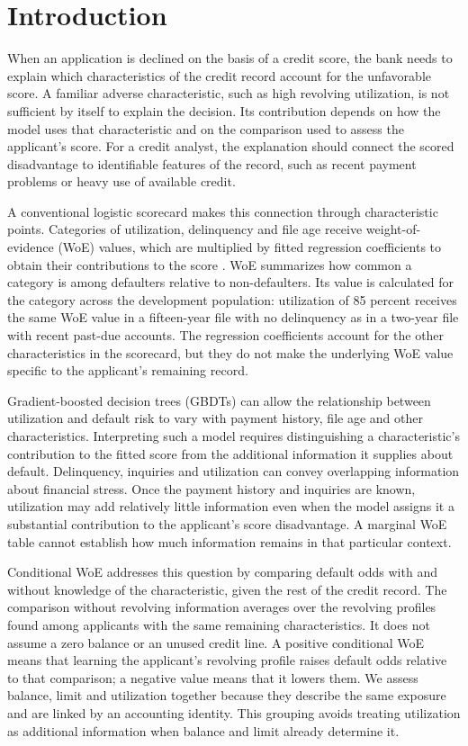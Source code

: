 \section{Introduction}

When an application is declined on the basis of a credit score, the bank needs to explain which characteristics of the credit record account for the unfavorable score. A familiar adverse characteristic, such as high revolving utilization, is not sufficient by itself to explain the decision. Its contribution depends on how the model uses that characteristic and on the comparison used to assess the applicant's score. For a credit analyst, the explanation should connect the scored disadvantage to identifiable features of the record, such as recent payment problems or heavy use of available credit.

A conventional logistic scorecard makes this connection through characteristic points. Categories of utilization, delinquency and file age receive weight-of-evidence (WoE) values, which are multiplied by fitted regression coefficients to obtain their contributions to the score \citep{siddiqi,good}. WoE summarizes how common a category is among defaulters relative to non-defaulters. Its value is calculated for the category across the development population: utilization of 85 percent receives the same WoE value in a fifteen-year file with no delinquency as in a two-year file with recent past-due accounts. The regression coefficients account for the other characteristics in the scorecard, but they do not make the underlying WoE value specific to the applicant's remaining record.

Gradient-boosted decision trees (GBDTs) can allow the relationship between utilization and default risk to vary with payment history, file age and other characteristics. Interpreting such a model requires distinguishing a characteristic's contribution to the fitted score from the additional information it supplies about default. Delinquency, inquiries and utilization can convey overlapping information about financial stress. Once the payment history and inquiries are known, utilization may add relatively little information even when the model assigns it a substantial contribution to the applicant's score disadvantage. A marginal WoE table cannot establish how much information remains in that particular context.

Conditional WoE addresses this question by comparing default odds with and without knowledge of the characteristic, given the rest of the credit record. The comparison without revolving information averages over the revolving profiles found among applicants with the same remaining characteristics. It does not assume a zero balance or an unused credit line. A positive conditional WoE means that learning the applicant's revolving profile raises default odds relative to that comparison; a negative value means that it lowers them. We assess balance, limit and utilization together because they describe the same exposure and are linked by an accounting identity. This grouping avoids treating utilization as additional information when balance and limit already determine it.


